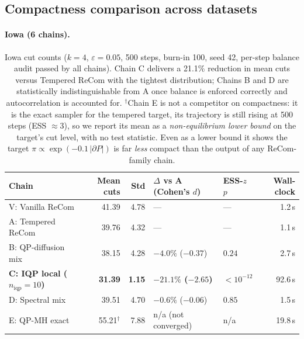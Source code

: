 \documentclass[11pt]{article}
\begin{document}
\subsection{Compactness comparison across datasets}\label{sec:exp-compactness}

\paragraph{Iowa (6 chains).}\label{sec:exp-iowa}

\begin{table}[H]
\centering
\small
\begin{tabular}{lrrllr}
\toprule
Chain & Mean cuts & Std & $\Delta$ vs A (Cohen's $d$) & ESS-$z$ $p$ & Wall-clock \\
\midrule
V: Vanilla ReCom         & 41.39 & 4.78 & ---                & ---     & 1.2\,s \\
A: Tempered ReCom        & 39.76 & 4.32 & ---                & ---     & 1.1\,s \\
B: QP-diffusion mix      & 38.15 & 4.28 & $-4.0\%$ ($-0.37$) & $0.24$  & 2.7\,s \\
\textbf{C: IQP local ($n_{\mathrm{iqp}} = 10$)}
                         & \textbf{31.39} & \textbf{1.15}
                         & \textbf{$-21.1\%$ ($-2.65$)} & $< 10^{-12}$ & 92.6\,s \\
D: Spectral mix          & 39.51 & 4.70 & $-0.6\%$ ($-0.06$) & $0.85$  & 1.5\,s \\
E: QP-MH exact           & 55.21$^{\dagger}$ & 7.88 & n/a (not converged) & n/a & 19.8\,s \\
\bottomrule
\end{tabular}
\caption{Iowa cut counts ($k = 4$, $\varepsilon = 0.05$, 500 steps,
  burn-in 100, seed 42, per-step balance audit passed by all chains).
  Chain C delivers a 21.1\% reduction in mean cuts versus Tempered
  ReCom with the tightest distribution; Chains B and D are
  statistically indistinguishable from A once balance is enforced
  correctly and autocorrelation is accounted for. $^{\dagger}$Chain E
  is not a competitor on compactness: it is the exact sampler for the
  tempered target, its trajectory is still rising at 500 steps
  (ESS $\approx 3$), so we report its mean as a \emph{non-equilibrium
  lower bound} on the target's cut level, with no test statistic.
  Even as a lower bound it shows the target
  $\pi \propto \exp(-0.1\,|\partial P|)$ is far \emph{less} compact
  than the output of any ReCom-family chain.}\label{tab:iowa-headline}
\end{table}
\end{document}
